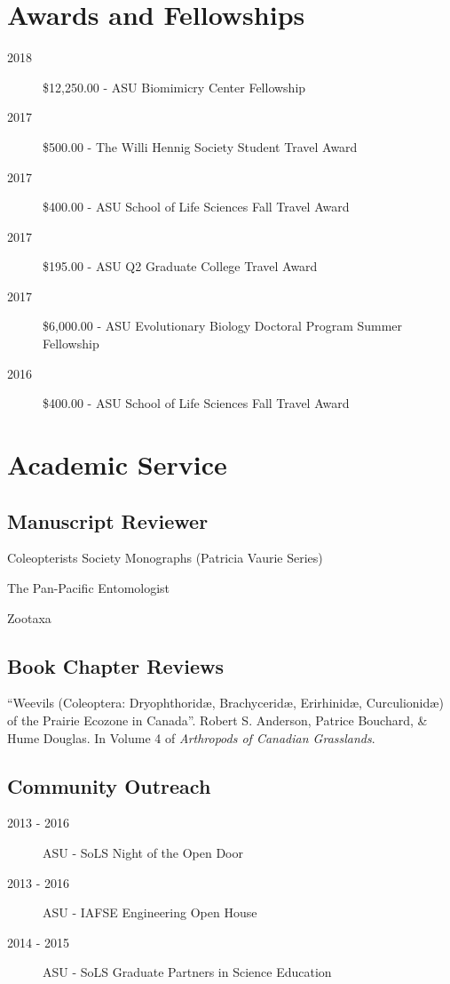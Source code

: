 \documentclass[12pt,a4paper]{article}
\begin{document}
\section*{Awards and Fellowships}
	\begin{description}
		\item [2018] \$12,250.00 - ASU Biomimicry Center Fellowship
		\item [2017] \$500.00 - The Willi Hennig Society Student Travel Award
		\item [2017] \$400.00 - ASU School of Life Sciences Fall Travel Award
		\item [2017] \$195.00 - ASU Q2 Graduate College Travel Award
		\item [2017] \$6,000.00 - ASU Evolutionary Biology Doctoral Program Summer Fellowship
		\item [2016] \$400.00 - ASU School of Life Sciences Fall Travel Award
	\end{description}

\section*{Academic Service}
	\subsection*{Manuscript Reviewer}
		\begin{description}
			\item Coleopterists Society Monographs (Patricia Vaurie Series) 
			\item The Pan-Pacific Entomologist 
			\item Zootaxa
		\end{description}

	\subsection*{Book Chapter Reviews}
		\begin{description}
			\item ``Weevils (Coleoptera: Dryophthorid\ae, Brachycerid\ae, Erirhinid\ae, Curculionid\ae) of the Prairie Ecozone in Canada''.
					Robert S. Anderson, Patrice Bouchard, \& Hume Douglas.
					In Volume 4 of \textit{Arthropods of Canadian Grasslands}.
		\end{description}

	\subsection*{Community Outreach}
		\begin{description}
			\item [2013 - 2016] ASU - SoLS Night of the Open Door
			\item [2013 - 2016] ASU - IAFSE Engineering Open House
			\item [2014 - 2015] ASU - SoLS Graduate Partners in Science Education
		\end{description}
		
\end{document}
